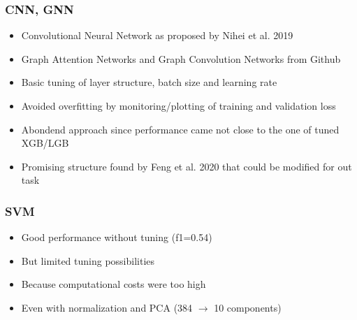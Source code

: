 \begin{frame}
\frametitle{CNN, GNN}
\begin{itemize}
    \item Convolutional Neural Network as proposed by Nihei et al. 2019 \cite{mti3030050}
    \item Graph Attention Networks and Graph Convolution Networks from Github 
    \item Basic tuning of layer structure, batch size and learning rate
    \item Avoided overfitting by monitoring/plotting of training and validation loss
    \item Abondend approach since performance came not close to the one of tuned XGB/LGB
    \item Promising structure found by Feng et al. 2020 \cite{DBLP:journals/corr/abs-2012-03502} that could be modified for out task
\end{itemize}

\end{frame}



\begin{frame}
\frametitle{SVM}
\begin{itemize} 
    \item Good performance without tuning (f1=0.54)
    \item But limited tuning possibilities 
    \item Because computational costs were too high 
    \item Even with normalization and PCA (384 $\rightarrow$ 10 components)
\end{itemize}

\end{frame}



